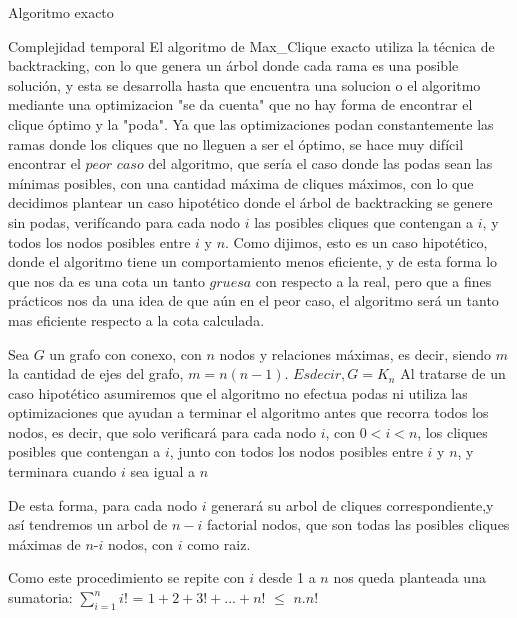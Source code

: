 \begin{section}{Algoritmo exacto}
\begin{subsection}{Complejidad temporal}
		El algoritmo de Max\_Clique exacto utiliza la técnica de backtracking, con lo que genera un árbol donde cada rama es una posible solución, y esta se desarrolla hasta que encuentra una solucion o el algoritmo mediante una optimizacion "se da cuenta" que no hay forma de encontrar el clique óptimo y la "poda".
		Ya que las optimizaciones podan constantemente las ramas donde los cliques que no lleguen a ser el óptimo, se hace muy difícil encontrar el $peor$ $caso$ del algoritmo, que sería el caso donde las podas sean las mínimas posibles, con una cantidad máxima de cliques máximos, con lo que decidimos plantear un caso hipotético donde el árbol de backtracking se genere sin podas, verifícando para cada nodo $i$ las posibles cliques que contengan a $i$, y todos los nodos posibles entre $i$ y $n$. Como dijimos, esto es un caso hipotético, donde el algoritmo tiene un comportamiento menos eficiente, y de esta forma lo que nos da es una cota un tanto $gruesa$ con respecto a la real, pero que a fines prácticos nos da una idea de que aún en el peor caso, el algoritmo será un tanto mas eficiente respecto a la cota calculada. 

		Sea $G$ un grafo con conexo, con $n$ nodos y relaciones máximas, es decir, siendo $m$ la cantidad de ejes del grafo, $m = n(n-1)$. $Es decir, G = K_n$
		Al tratarse de un caso hipotético asumiremos que el algoritmo no efectua podas ni utiliza las optimizaciones que ayudan a terminar el algoritmo antes que recorra todos los nodos, es decir, que solo verificará para cada nodo $i$, con $0 < i < n$, los cliques posibles que contengan a $i$, junto con todos los nodos posibles entre $i$ y $n$, y terminara cuando $i$ sea igual a $n$

		De esta forma, para cada nodo $i$ generará su arbol de cliques correspondiente,y así tendremos un arbol de $n-i$ factorial nodos, que son todas las posibles cliques máximas de $n$-$i$ nodos, con $i$ como raiz.

		Como este procedimiento se repite con $i$ desde 1 a $n$ nos queda planteada una sumatoria: $\sum_{i=1}^{n}{i!}$ = $1 + 2 + 3! + ... + n!$ $\leq$  $n.n!$
		
		
		
		\end{subsection}
\end{section}

